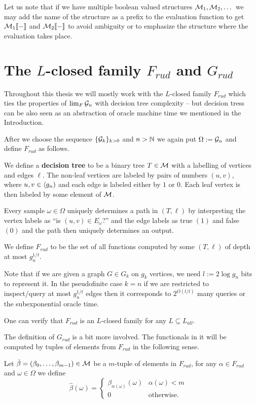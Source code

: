 Let us note that if we have multiple boolean valued structures $\mathcal{M}_1,\mathcal{M}_2,\dots$ we may add the name of the structure as a prefix to the evaluation function to get $\mathcal{M}_1\llbracket-\rrbracket$ and $\mathcal{M}_2\llbracket-\rrbracket$ to avoid ambiguity or to emphasize the structure where the evaluation takes place.
 
\section{The $L$-closed family $F_{rud}$ and $G_{rud}$}\label{secFrud}

Throughout this thesis we will mostly work with the $L$-closed family $F_{rud}$ which ties the properties of $\lim_F \mathcal{G}_n$ with decision tree complexity -- but decision tress can be also seen as an abstraction of oracle machine time we mentioned in the Introduction.

After we choose the sequence $\{\mathcal{G}_k\}_{k>0}$ and $n>\mathbb{N}$ we again put $\Omega:=\mathcal{G}_n$ and define $F_{rud}$ as follows.

\begin{defi}
We define a \textbf{decision tree} to be a binary tree $T\in\mathcal{M}$ with a labelling of vertices and edges $\ell$. The non-leaf vertices are labeled by pairs of numbers $(u,v)$, where $u,v\in\langle g_n)$ and each edge is labeled either by $1$ or $0$. Each leaf vertex is then labeled by some element of $\mathcal{M}$.

Every sample $\omega\in\Omega$ uniquely determines a path in $(T,\ell)$ by interpreting the vertex labels as ``is $(u,v)\in E_\omega$?'' and the edge labels as true $(1)$ and false $(0)$ and the path then uniquely determines an output.

We define $F_{rud}$ to be the set of all functions computed by some $(T,\ell)$ of depth at most $g_n^{1/t}$.
\end{defi}

Note that if we are given a graph $G\in G_k$ on $g_k$ vertices, we need $l:=2\log g_n$ bits to represent it. In the pseudofinite case $k=n$ if we are restricted to inspect/query at most $g_n^{1/t}$ edges then it corresponds to $2^{O(l/t)}$ many queries or the subexponential oracle time.

One can verify that $F_{rud}$ is an $L$-closed family for any $L\subseteq L_{all}$.

The definition of $G_{rud}$ is a bit more involved. The functionals in it will be computed by tuples of elements from $F_{rud}$ in the following sense.

\begin{defi}
Let $\hat\beta=(\beta_0,\dots,\beta_{m-1})\in\mathcal{M}$ be a $m$-tuple of elements in $F_{rud}$, for any $\alpha\in F_{rud}$ and $\omega\in\Omega$ we define
\[\hat\beta(\omega)=
\begin{cases}
\beta_{\alpha(\omega)}(\omega)&\alpha(\omega)<m\\
0&\text{otherwise.}
\end{cases}\]
\end{defi}

